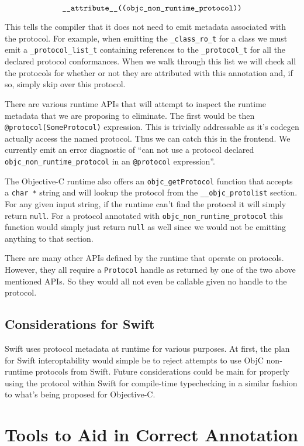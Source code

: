 \documentclass{article}
\begin{document}
\[ \verb|__attribute__((objc_non_runtime_protocol))| \]

This tells the compiler that it does not need to emit metadata associated with
the protocol. For example, when emitting the \verb|_class_ro_t| for a class we
must emit a \verb|_protocol_list_t| containing references to the
\verb|_protocol_t| for all the declared protocol conformances. When we walk
through this list we will check all the protocols for whether or not they are
attributed with this annotation and, if so, simply skip over this protocol.

There are various runtime APIs that will attempt to inspect the runtime metadata
that we are proposing to eliminate. The first would be then \linebreak
\verb|@protocol(SomeProtocol)| expression. This is trivially addressable as it's
codegen actually access the named protocol. Thus we can catch this in the
frontend. We currently emit an error diagnostic of ``can not use a protocol
declared \verb|objc_non_runtime_protocol| in an \verb|@protocol| expression''.

The Objective-C runtime also offers an \verb|objc_getProtocol| function that
accepts a \verb|char *| string and will lookup the protocol from the
\verb|__objc_protolist| section. For any given input string, if the
runtime can't find the protocol it will simply return \verb|null|. For a protocol
annotated with \verb|objc_non_runtime_protocol| this function would simply just
return \verb|null| as well since we would not be emitting anything to that
section.

There are many other APIs defined by the runtime that operate on protocols.
However, they all require a \verb|Protocol| handle as returned by one of the two
above mentioned APIs. So they would all not even be callable given no handle to
the protocol.

\subsection{Considerations for Swift}

Swift uses protocol metadata at runtime for various purposes. At first, the plan
for Swift interoptability would simple be to reject attempts to use ObjC
non-runtime protocols from Swift. Future considerations could be main for
properly using the protocol within Swift for compile-time typechecking in a
similar fashion to what's being proposed for Objective-C.

\section{Tools to Aid in Correct Annotation}
\end{document}
